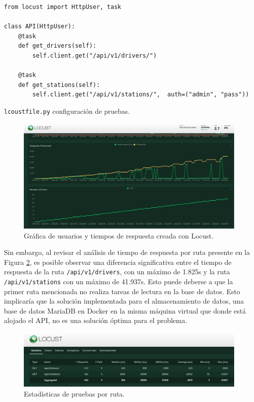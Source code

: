 \begin{listing}
\begin{verbatim}
from locust import HttpUser, task

class API(HttpUser):
    @task
    def get_drivers(self):
        self.client.get("/api/v1/drivers/")

    @task
    def get_stations(self):
        self.client.get("/api/v1/stations/",  auth=("admin", "pass"))
\end{verbatim}
\caption{\texttt{lcoustfile.py} configuración de pruebas.}
\label{lst:locust-config}
\end{listing}


\begin{figure}[!ht]
   \centering
   \includegraphics[width=1\linewidth]{images/screenshots/locust_graphs.png}
   \caption{Gráfica de usuarios y tiempos de respuesta creada con Locust.}
   \label{fig:locust-graphs}
\end{figure}

Sin embargo, al revisar el análisis de tiempo de respuesta por ruta presente en la Figura \ref{fig:locust-analysis}, es posible observar una diferencia significativa entre el tiempo de respuesta de la ruta \texttt{/api/v1/drivers}, con un máximo de 1.825s y la ruta \texttt{/api/v1/stations} con un máximo de 41.937s. Esto puede deberse a que la primer ruta mencionada no realiza tareas de lectura en la base de datos. Esto implicaría que la solución implementada para el almacenamiento de datos, una base de datos MariaDB en Docker en la misma máquina virtual que donde está alojado el API, no es una solución óptima para el problema.

\begin{figure}[!ht]
   \centering
   \includegraphics[width=1\linewidth]{images/screenshots/locust_analysis.png}
   \caption{Estadísticas de pruebas por ruta.}
   \label{fig:locust-analysis}
\end{figure}
